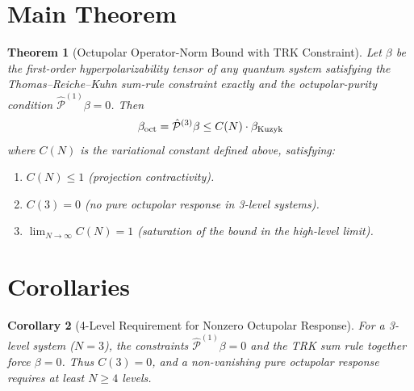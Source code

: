\documentclass[11pt]{article}
\newcommand{\Proj}[1]{\hat{\mathcal{P}}^{(#1)}}
\newtheorem{theorem}{Theorem}[section]
\newtheorem{corollary}[theorem]{Corollary}
\begin{document}
\section{Main Theorem}

\begin{theorem}[Octupolar Operator-Norm Bound with TRK Constraint]
\label{thm:octupolar_bound}
Let $\beta$ be the first-order hyperpolarizability tensor of any quantum system satisfying the Thomas--Reiche--Kuhn sum-rule constraint exactly and the octupolar-purity condition $\Proj{1}\beta=0$. Then
\[
\beta_{\rm oct}=\Proj{3}\beta \le C(N) \cdot \beta_{\rm Kuzyk}
\]
where $C(N)$ is the variational constant defined above, satisfying:
\begin{enumerate}
\item[(i)] $C(N) \le 1$ (projection contractivity).
\item[(ii)] $C(3) = 0$ (no pure octupolar response in 3-level systems).
\item[(iii)] $\lim_{N\to\infty} C(N) = 1$ (saturation of the bound in the high-level limit).
\end{enumerate}
\end{theorem}

\section{Corollaries}

\begin{corollary}[4-Level Requirement for Nonzero Octupolar Response]
\label{cor:4level}
For a 3-level system ($N=3$), the constraints $\Proj{1}\beta=0$ and the TRK sum rule together force $\beta=0$. Thus $C(3)=0$, and a non-vanishing pure octupolar response requires at least $N \ge 4$ levels.
\end{corollary}
\end{document}
